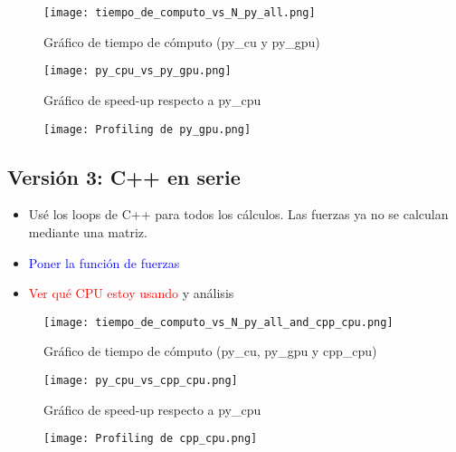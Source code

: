 \documentclass[aps,prb,twocolumn,superscriptaddress,floatfix,longbibliography]{revtex4-2}
\newcounter{para}
\begin{document}
\begin{itemize}
\begin{figure}[h]
    \texttt{[image: tiempo\_de\_computo\_vs\_N\_py\_all.png]}
    \caption{Gráfico de tiempo de cómputo (py_cu y py_gpu)}
     \label{fig:tiempo_de_computo_vs_N_py_all}
\end{figure}

\begin{figure}[h]
    \texttt{[image: py\_cpu\_vs\_py\_gpu.png]}
    \caption{Gráfico de speed-up respecto a py_cpu}
     \label{fig:py_cpu_vs_py_gpu}
\end{figure}

\begin{figure}[h]
    \texttt{[image: Profiling de py\_gpu.png]}
    \caption{}
     \label{fig:Profiling de py_gpu}
\end{figure}




\subsection{Versión 3: C++ en serie}

\begin{itemize}
    \item Usé los loops de C++ para todos los cálculos. Las fuerzas ya no se calculan mediante una matriz.
    \item \textcolor{blue}{Poner la función de fuerzas}
    \item \textcolor{red}{Ver qué CPU estoy usando} y análisis
\end{itemize}


\begin{figure}[h]
    \texttt{[image: tiempo\_de\_computo\_vs\_N\_py\_all\_and\_cpp\_cpu.png]}
    \caption{Gráfico de tiempo de cómputo (py_cu, py_gpu y cpp_cpu)}
     \label{fig:tiempo_de_computo_vs_N_py_all_and_cpp_cpu}
\end{figure}


\begin{figure}[h]
    \texttt{[image: py\_cpu\_vs\_cpp\_cpu.png]}
    \caption{Gráfico de speed-up respecto a py_cpu}
     \label{fig:py_cpu_vs_cpp_cpu}
\end{figure}

\begin{figure}[h]
    \texttt{[image: Profiling de cpp\_cpu.png]}
    \caption{}
     \label{fig:Profiling de cpp_cpu}
\end{figure}



\end{itemize}
\end{document}
